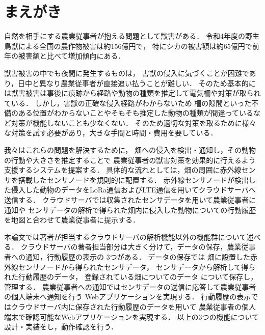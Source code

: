 \documentclass[12pt]{honka_v1}
\begin{document}
\fi
\section{まえがき}
自然を相手にする農業従事者が抱える問題として獣害がある．
令和4年度の野生鳥獣による全国の農作物被害は約156億円で，
特にシカの被害額は約65億円で前年の被害額と比べて増加傾向にある\cite{bib:jugaihigai-web}．

獣害被害の中でも夜間に発生するものは，
害獣の侵入に気づくことが困難であり，日中と異なり農業従事者が直接追い払うことが難しい．
そのため基本的には獣害被害は事後に痕跡から経路や動物の種類を推定して電気柵や対策が取られている．
しかし，害獣の正確な侵入経路がわからないため
柵の隙間といった不備のある位置がわからないことやそもそも推定した動物の種類が間違っているなど対策が機能しないことも少なくない．
そのため適切な対策を取るために様々な対策を試す必要があり，大きな手間と時間・費用を要している．


我々はこれらの問題を解決するために，
畑への侵入を検出・通知し，その動物の行動や大きさを推定することで
農業従事者の獣害対策を効果的に行えるよう支援するシステムを提案する．
具体的な流れとしては，畑の周囲に赤外線センサを搭載したセンサノードを規則的に配置する．
赤外線センサノードが検出した侵入した動物のデータをLoRa通信およびLTE通信を用いてクラウドサーバへ送信する．
クラウドサーバでは収集されたセンサデータを用いて農業従事者に通知や
センサデータの解析で得られた畑内に侵入した動物についての行動履歴を地図と合わせて農業従事者に提示する．

本論文では著者が担当するクラウドサーバの解析機能以外の機能群について述べる．
クラウドサーバの著者担当部分は大きく分けて，データの保存，農業従事者への通知，行動履歴の表示の
3つがある．
データの保存では
畑に設置した赤外線センサノードから得られたセンサデータ，
センサデータから解析して得られた行動履歴のデータ，
登録されている畑についてのデータ
について保存し，管理する．
農業従事者への通知ではセンサデータの送信に応答して農業従事者の個人端末へ通知を行う
Webアプリケーションを実現する．
行動履歴の表示ではクラウドサーバ内に保存された行動履歴のデータを用いて
農業従事者の個人端末で確認可能なWebアプリケーションを実現する．
以上の3つの機能について
設計・実装をし，動作確認を行う．
\end{document}
